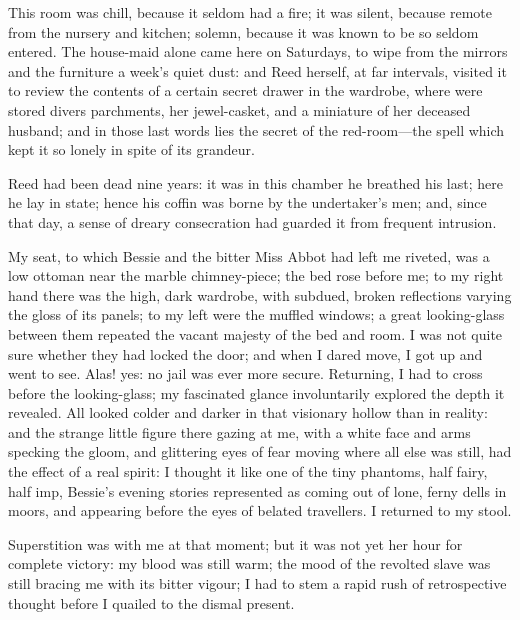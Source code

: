 This room was chill, because it seldom had a fire; it was silent,
because remote from the nursery and kitchen; solemn, because it was
known to be so seldom entered.  The house-maid alone came here on
Saturdays, to wipe from the mirrors and the furniture a week's quiet
dust: and \Mrs{} Reed herself, at far intervals, visited it to review the
contents of a certain secret drawer in the wardrobe, where were stored
divers parchments, her jewel-casket, and a miniature of her deceased
husband; and in those last words lies the secret of the red-room---the
spell which kept it so lonely in spite of its grandeur.

\Mr{} Reed had been dead nine years: it was in this chamber he breathed
his last; here he lay in state; hence his coffin was borne by the
undertaker's men; and, since that day, a sense of dreary consecration
had guarded it from frequent intrusion.

My seat, to which Bessie and the bitter Miss Abbot had left me riveted,
was a low ottoman near the marble chimney-piece; the bed rose before me;
to my right hand there was the high, dark wardrobe, with subdued, broken
reflections varying the gloss of its panels; to my left were the muffled
windows; a great looking-glass between them repeated the vacant majesty
of the bed and room.  I was not quite sure whether they had locked the
door; and when I dared move, I got up and went to see.  Alas! yes: no
jail was ever more secure.  Returning, I had to cross before the
looking-glass; my fascinated glance involuntarily explored the depth it
revealed.  All looked colder and darker in that visionary hollow than in
reality: and the strange little figure there gazing at me, with a white
face and arms specking the gloom, and glittering eyes of fear moving
where all else was still, had the effect of a real spirit: I thought it
like one of the tiny phantoms, half fairy, half imp, Bessie's evening
stories represented as coming out of lone, ferny dells in moors, and
appearing before the eyes of belated travellers.  I returned to my
stool.

Superstition was with me at that moment; but it was not yet her hour for
complete victory: my blood was still warm; the mood of the revolted
slave was still bracing me with its bitter vigour; I had to stem a rapid
rush of retrospective thought before I quailed to the dismal present.

